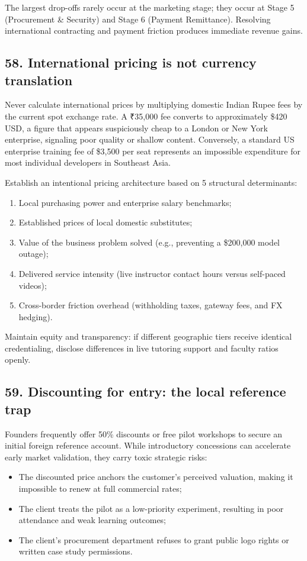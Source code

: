 The largest drop-offs rarely occur at the marketing stage; they occur at Stage 5 (Procurement \& Security) and Stage 6 (Payment Remittance). Resolving international contracting and payment friction produces immediate revenue gains.

\subsection{58. International pricing is not currency translation}

Never calculate international prices by multiplying domestic Indian Rupee fees by the current spot exchange rate. A ₹35,000 fee converts to approximately \$420 USD, a figure that appears suspiciously cheap to a London or New York enterprise, signaling poor quality or shallow content. Conversely, a standard US enterprise training fee of \$3,500 per seat represents an impossible expenditure for most individual developers in Southeast Asia.

Establish an intentional pricing architecture based on 5 structural determinants:
\begin{enumerate}
    \item Local purchasing power and enterprise salary benchmarks;
    \item Established prices of local domestic substitutes;
    \item Value of the business problem solved (e.g., preventing a \$200,000 model outage);
    \item Delivered service intensity (live instructor contact hours versus self-paced videos);
    \item Cross-border friction overhead (withholding taxes, gateway fees, and FX hedging).
\end{enumerate}
Maintain equity and transparency: if different geographic tiers receive identical credentialing, disclose differences in live tutoring support and faculty ratios openly.

\subsection{59. Discounting for entry: the local reference trap}

Founders frequently offer 50\% discounts or free pilot workshops to secure an initial foreign reference account. While introductory concessions can accelerate early market validation, they carry toxic strategic risks:
\begin{itemize}
    \item The discounted price anchors the customer's perceived valuation, making it impossible to renew at full commercial rates;
    \item The client treats the pilot as a low-priority experiment, resulting in poor attendance and weak learning outcomes;
    \item The client's procurement department refuses to grant public logo rights or written case study permissions.
\end{itemize}

